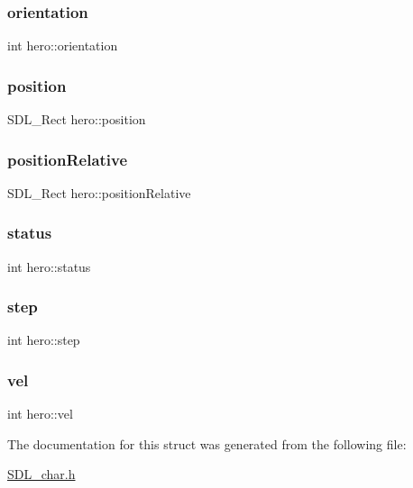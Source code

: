 \subsubsection{\texorpdfstring{orientation}{orientation}}
{\footnotesize\ttfamily int hero\+::orientation}

\mbox{\label{structhero_a0bacee409a7f3adbb86669712a83ec31}} 
\subsubsection{\texorpdfstring{position}{position}}
{\footnotesize\ttfamily S\+D\+L\+\_\+\+Rect hero\+::position}

\mbox{\label{structhero_a3b8e1b3b93eb28871f9b03e360857ec4}} 
\subsubsection{\texorpdfstring{positionRelative}{positionRelative}}
{\footnotesize\ttfamily S\+D\+L\+\_\+\+Rect hero\+::position\+Relative}

\mbox{\label{structhero_a8b17e22b91882ecdd12171b68d512d04}} 
\subsubsection{\texorpdfstring{status}{status}}
{\footnotesize\ttfamily int hero\+::status}

\mbox{\label{structhero_a8ac297ec48dd04afbf3c8bebd513eb0a}} 
\subsubsection{\texorpdfstring{step}{step}}
{\footnotesize\ttfamily int hero\+::step}

\mbox{\label{structhero_af1040b37d461b8ebee7143a9361bc986}} 
\subsubsection{\texorpdfstring{vel}{vel}}
{\footnotesize\ttfamily int hero\+::vel}



The documentation for this struct was generated from the following file\+:\begin{DoxyCompactItemize}
\item 
\mbox{\hyperlink{SDL__char_8h}{S\+D\+L\+\_\+char.\+h}}\end{DoxyCompactItemize}
